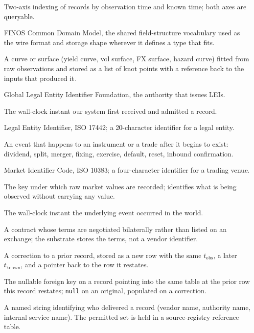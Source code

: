 \documentclass[11pt,a4paper]{article}
\begin{document}
\begin{description}[style=nextline,leftmargin=1em,labelindent=0pt]
\item[Bitemporal] Two-axis indexing of records by observation time and known time; both axes are queryable.
\item[CDM] FINOS Common Domain Model, the shared field-structure vocabulary used as the wire format and storage shape wherever it defines a type that fits.
\item[Calibrated market object] A curve or surface (yield curve, vol surface, FX surface, hazard curve) fitted from raw observations and stored as a list of knot points with a reference back to the inputs that produced it.
\item[GLEIF] Global Legal Entity Identifier Foundation, the authority that issues LEIs.
\item[Known time ($t_\text{known}$)] The wall-clock instant our system first received and admitted a record.
\item[LEI] Legal Entity Identifier, ISO 17442; a 20-character identifier for a legal entity.
\item[Lifecycle event] An event that happens to an instrument or a trade after it begins to exist: dividend, split, merger, fixing, exercise, default, reset, inbound confirmation.
\item[MIC] Market Identifier Code, ISO 10383; a four-character identifier for a trading venue.
\item[Observable definition] The key under which raw market values are recorded; identifies what is being observed without carrying any value.
\item[Observation time ($t_\text{obs}$)] The wall-clock instant the underlying event occurred in the world.
\item[OTC product] A contract whose terms are negotiated bilaterally rather than listed on an exchange; the substrate stores the terms, not a vendor identifier.
\item[Restatement] A correction to a prior record, stored as a new row with the same $t_\text{obs}$, a later $t_\text{known}$, and a pointer back to the row it restates.
\item[\texttt{restates\_ref}] The nullable foreign key on a record pointing into the same table at the prior row this record restates; \texttt{null} on an original, populated on a correction.
\item[Source] A named string identifying who delivered a record (vendor name, authority name, internal service name). The permitted set is held in a source-registry reference table.

\end{description}
\end{document}
